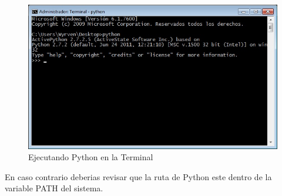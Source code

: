\begin{figure}[h]
    \centering
    \includegraphics[scale=0.7]{resourse/consola-python.jpg}
    \caption{Ejecutando Python en la Terminal}
    \label{fig:01}
\end{figure}    

En caso contrario deberias revisar que la ruta de Python este dentro de la variable
 PATH del sistema.




